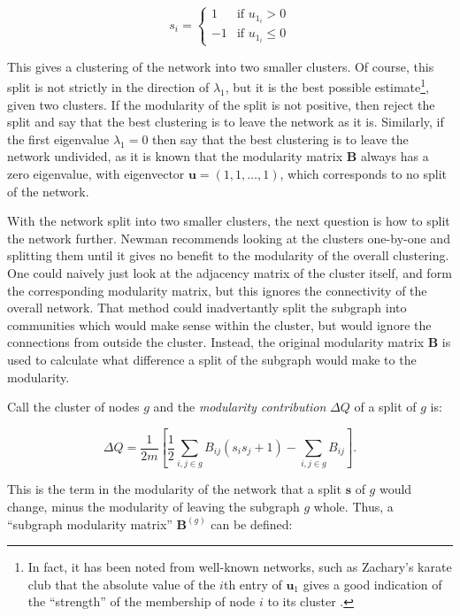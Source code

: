 \begin{equation}
s_i =\left\{ \begin{array}{ll} 1 & \mbox{if } u_{1_i}>0 \\
-1 & \mbox{if } u_{1_i}\leq0 \end{array} \right.
\end{equation}

This gives a clustering of the network into two smaller clusters. Of course, 
this split is not strictly in the direction of $\lambda_1$, but it is the best 
possible estimate\footnote{In fact, it has been noted from well-known networks, 
such as Zachary's karate club \cite{Zachary1977a} that the absolute value of 
the $i$th entry of $\mathbf{u}_1$ gives a good indication of the ``strength'' 
of the membership of node $i$ to its cluster \cite{Newman2006a}.}, given two 
clusters. If the modularity of the split is not positive, then reject the 
split and say that the best clustering is to leave the network as it is.  
Similarly, if the first eigenvalue $\lambda_1 = 0$ then say that the best 
clustering is to leave the network undivided, as it is known that the modularity 
matrix $\mathbf{B}$ always has a zero eigenvalue, with eigenvector 
$\mathbf{u} = ( 1,1, \ldots, 1)$, which corresponds to no split of the network.

With the network split into two smaller clusters, the next
question is how to split the network further.  Newman \cite{Newman2006a} recommends looking at the clusters
one-by-one and splitting them until it gives no benefit to the modularity
of the overall clustering.  One could naively just look at the
adjacency matrix of the cluster itself, and form the 
corresponding modularity matrix, but this ignores the connectivity of the
overall network.  That method could inadvertantly split the subgraph into communities 
which would make sense within the cluster, but would ignore the connections 
from outside the cluster. Instead, the original modularity 
matrix $\mathbf{B}$ is used to calculate what difference a split of the subgraph would 
make to the modularity.

Call the cluster of nodes $g$ and the \emph{modularity contribution} $\Delta Q$ of a 
split of $g$ is:

\begin{equation}
\Delta Q  =  \frac{1}{2m} \left[ \frac{1}{2}\sum_{i,j\in g}B_{ij}(s_is_j + 1) - \sum_{i,j \in g} B_{ij} \right].
\end{equation}

This is the term in the modularity of the network that a split $\mathbf{s}$ of 
$g$ would change, minus the modularity of leaving the subgraph $g$ whole.  Thus, a ``subgraph modularity matrix'' $\mathbf{B}^{(g)}$ can be defined:

